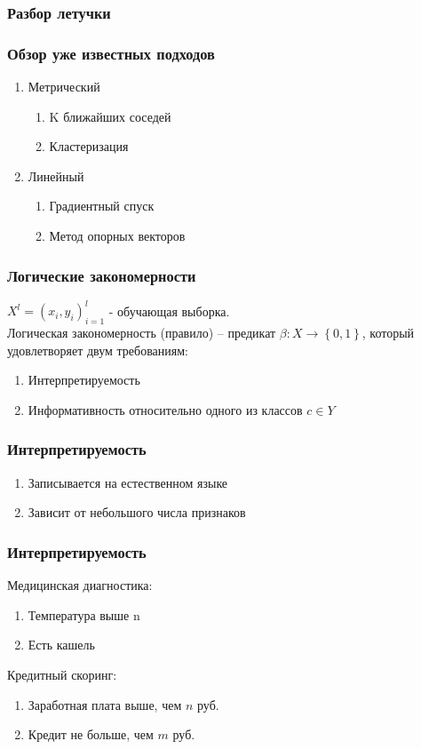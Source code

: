 \documentclass[12pt]{beamer}
\subtitle{Лекция 8. Логические алгоритмы классификации.}
\begin{document}
	
\frame{\titlepage}

\begin{frame}\frametitle{Разбор летучки}

\end{frame}

\begin{frame}\frametitle{Обзор уже известных подходов}
\begin{enumerate} 
	\item Метрический
		\begin{enumerate} [--]
			\item K ближайших соседей
			\item Кластеризация 
		\end{enumerate}
	\item Линейный
		\begin{enumerate} [--]
			\item Градиентный спуск
			\item Метод опорных векторов
		\end{enumerate}
\end{enumerate}
\end{frame}

\begin{frame}\frametitle{Логические закономерности}
${X^l = \left( x_i, y_i \right)_{i=1}^l}$ - обучающая выборка.\\
\vspace{5mm}
Логическая закономерность (правило) -- предикат ${\beta: X \rightarrow \left\{ 0, 1 \right\} }$, который удовлетворяет двум требованиям:\\
\begin{enumerate} [-]
	\item Интерпретируемость
	\item Информативность относительно одного из классов ${c \in Y}$
\end{enumerate}
\end{frame}


\begin{frame}\frametitle{Интерпретируемость}
	\begin{enumerate} [-]
		\item Записывается на естественном языке
		\item Зависит от небольшого числа признаков
	\end{enumerate}
\end{frame}

\begin{frame}\frametitle{Интерпретируемость}
Медицинская диагностика:	
	\begin{enumerate} [-]
		\item Температура выше n\degree
		\item Есть кашель
	\end{enumerate}
\vspace{5mm}
Кредитный скоринг:	
	\begin{enumerate} [-]
		\item Заработная плата выше, чем $n$ руб.
		\item Кредит не больше, чем $m$ руб.
	\end{enumerate}
\end{frame}
\end{document}
